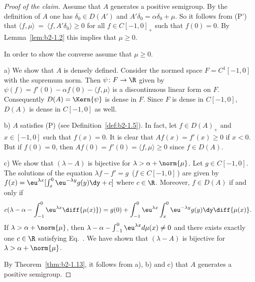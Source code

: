 \begin{proof}[Proof of the claim]
Assume that $A$ generates a positive semigroup.
By the definition of\/ $A$ one has $\delta_{0} \in D(A')$ and $A'\delta_{0} = \alpha\delta_{0} + \mu$.
So it follows from (P') that $\langle f,\mu \rangle~=~\langle f,A'\delta_{0} \rangle \geq 0$ for all $f \in C[-1,0]_{+}$ such that $f(0) = 0$.
By Lemma~\ref{lem:b2-1.2}
this implies that $\mu \geq 0$.

In order to show the converse assume that $\mu \geq 0$.

a) We show that $A$ is densely defined.
Consider the normed space $F = C^{1}[-1,0]$ with the supremum norm.
Then $\psi \colon F \to \R$ given by 
$\psi(f) = f'(0) - \alpha f(0) - \langle f,\mu \rangle$ 
is a discontinuous linear form on $F$.
Consequently $D(A) = \Kern{\psi}$ is dense in $F$.
Since $F$ is dense in $C[-1,0]$, $D(A)$ is dense in $C[-1,0]$ as well.

b) $A$ satisfies (P) (see Definition~\ref{def:b2-1.5}).
In fact, let $f \in D(A)_{+}$ and $x \in [-1,0]$ such that $f(x) = 0$.
It is clear that $Af(x) = f'(x) \geq 0$ if\/ $x < 0$.
But if\/ $f(0) = 0$, then $Af(0) = f'(0) = \langle f,\mu \rangle \geq 0$ since $f \in D(A)$.

c) We show that $(\lambda-A)$ is bijective for $\lambda > \alpha + \norm{\mu}$.
Let $g \in C[-1,0]$.
The solutions of the equation $\lambda f - f' = g$ \,($f \in C[-1,0]$\,) are given by $f(x) = \eu^{\lambda x}[\int_{x}^{0} \eu^{-\lambda y} g(y) \dy + c]$ where $c \in \R$.
Moreover, $f \in D(A)$ if and only if
\begin{equation}\label{eq:b2-1.13}
c(\lambda - \alpha - \int_{-1}^{0} \eu^{\lambda x} \diff{\mu(x)}) = g(0) + \int_{-1}^{0} \eu^{\lambda x} \int_{x}^{0}\eu^{-\lambda y} g(y) \dy\diff{\mu(x)}.
\end{equation}
If\/ $\lambda > \alpha + \norm{\mu}$, then $\lambda - \alpha - \int_{-1}^{0} \eu^{\lambda x} d\mu(x) \neq 0$ and there exists exactly one $c \in \R$ satisfying Eq.~.
We have shown that $(\lambda- A)$ is bijective for $\lambda > \alpha + \norm{\mu}$.

By Theorem~\ref{thm:b2-1.13}, it follows from a), b) and c) that $A$ generates a positive semigroup.
\end{proof}

